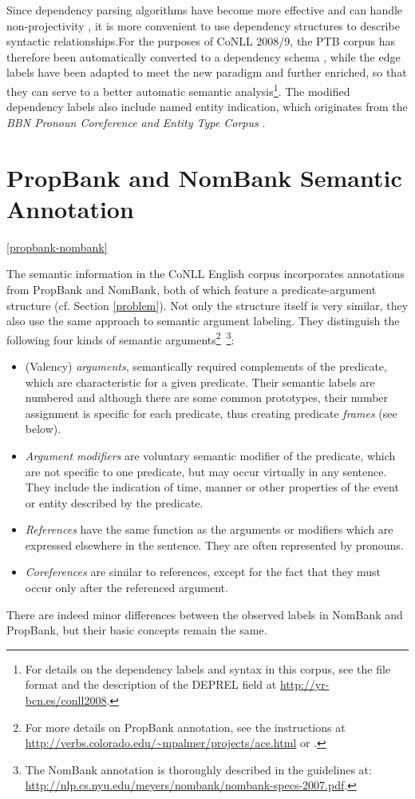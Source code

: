 \documentclass[12pt,notitlepage]{report}
\begin{document}
Since dependency parsing algorithms have become more effective and can handle non-projectivity \citep[cf.][]{mcdonald05}, it is more convenient to use dependency structures to describe syntactic relationships.For the purposes of CoNLL 2008/9, the PTB corpus has therefore been automatically converted to a dependency schema \citep{johansson07,surdeanu08}, while the edge labels have been adapted to meet the new paradigm and further enriched, so that they can serve to a better automatic semantic analysis\footnote{For details on the dependency labels and syntax in this corpus, see the file format and the description of the DEPREL field at \url{http://yr-bcn.es/conll2008}.}. The modified dependency labels also include named entity indication, which originates from the \emph{BBN Pronoun Coreference and Entity Type Corpus} \citep{weischedel05}.

\section{PropBank and NomBank Semantic Annotation}\ref{propbank-nombank}

The semantic information in the CoNLL English corpus incorporates annotations from PropBank and NomBank, both of which feature a predicate-argument structure (cf. Section \ref{problem}). Not only the structure itself is very similar, they also use the same approach to semantic argument labeling. They distinguish the following four kinds of semantic arguments\footnote{For more details on PropBank annotation, see the instructions at \url{http://verbs.colorado.edu/~mpalmer/projects/ace.html} or \citep{moreda06}.}~\footnote{The NomBank annotation is thoroughly described in the guidelines at: \\ \url{http://nlp.cs.nyu.edu/meyers/nombank/nombank-specs-2007.pdf}.}:
\begin{itemize} 
    \item (Valency) \emph{arguments}, semantically required complements of the predicate, which are characteristic for a given predicate. Their semantic labels are numbered and although there are some common prototypes, their number assignment is specific for each predicate, thus creating predicate \emph{frames} (see below).
    \item \emph{Argument modifiers} are voluntary semantic modifier of the predicate, which are not specific to one predicate, but may occur virtually in any sentence. They include the indication of time, manner or other properties of the event or entity described by the predicate.
    \item \emph{References} have the same function as the arguments or modifiers which are expressed elsewhere in the sentence. They are often represented by pronouns.
    \item \emph{Coreferences} are similar to references, except for the fact that they must occur only after the referenced argument. %
\end{itemize}
There are indeed minor differences between the observed labels in NomBank and PropBank, but their basic concepts remain the same.
\end{document}
